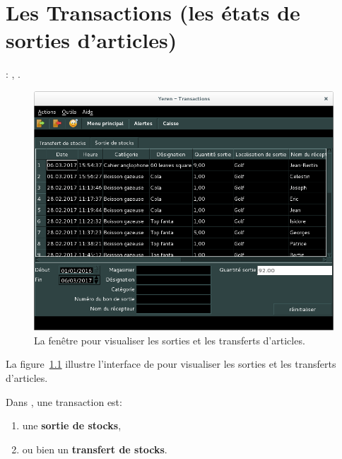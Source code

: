 \chapter{Les Transactions (les \'etats de sorties
	d'articles)}\label{chap:etats-des-sorties}

\utilisateurs: \lienmagasinier, \lienpatron.\\



\begin{figure}[!htbp]
	\centering
	\includegraphics[scale=0.45]{images/yeren-transactions.png}
	\caption{La fen\^etre pour visualiser les sorties et les
		transferts d'articles.}
	\label{fig:yeren-transactions}
\end{figure}

La figure~\ref{fig:yeren-transactions} illustre
l'interface de \yeren pour visualiser les sorties et les
transferts d'articles.

Dans \yeren, une transaction est:
\begin{enumerate}[1)]
	\item une \textbf{sortie de stocks},
	\item ou bien un \textbf{transfert de stocks}.\\
\end{enumerate}

